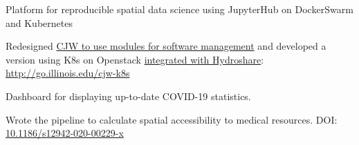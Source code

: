 \documentclass{acmresume}
\begin{document}
    
    
    \begin{titemize}
    	\item Platform for reproducible spatial data science using JupyterHub on DockerSwarm and Kubernetes
    	\item Redesigned \href{https://www.hydroshare.org/resource/4cfd280e8eb747169b293aec2862d4f5/}{CJW to use modules for software management} and developed a version using K8s on Openstack \href{https://www.hydroshare.org/resource/e9686eadd4474b6587d83d9330d25854/}{integrated with Hydroshare}: \href{http://go.illinois.edu/cjw-k8s}{http://go.illinois.edu/cjw-k8s}
    \end{titemize}
    
    \begin{titemize}
    	\item Dashboard for displaying up-to-date COVID-19 statistics.
    	\item Wrote the pipeline to calculate spatial accessibility to medical resources. DOI: \href{https://doi.org/10.1186/s12942-020-00229-x}{10.1186/s12942-020-00229-x}
    \end{titemize}

	
\end{document}
